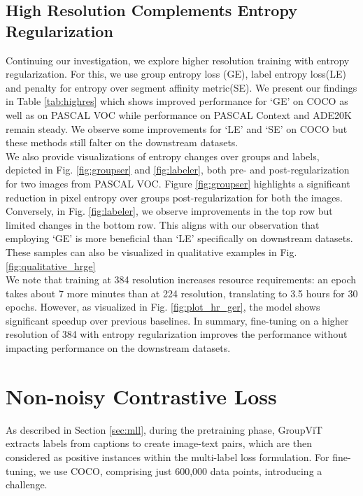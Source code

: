 \subsection{High Resolution Complements Entropy Regularization}
\label{sec:hrcer}
Continuing our investigation, we explore higher resolution training with entropy regularization. For this, we use group entropy loss (GE), label entropy loss(LE) and penalty for entropy over segment affinity metric(SE). We present our findings in Table \ref{tab:highres} which shows improved performance for `GE' on COCO as well as on PASCAL VOC while performance on PASCAL Context and ADE20K remain steady. We observe some improvements for `LE' and `SE' on COCO but these methods still falter on the downstream datasets. \\
We also provide visualizations of entropy changes over groups and labels, depicted in Fig. \ref{fig:groupser} and \ref{fig:labeler}, both pre- and post-regularization for two images from PASCAL VOC. Figure \ref{fig:groupser} highlights a significant reduction in pixel entropy over groups post-regularization for both the images. Conversely, in Fig. \ref{fig:labeler}, we observe improvements in the top row but limited changes in the bottom row. This aligns with our observation that employing `GE' is more beneficial than `LE' specifically on downstream datasets. These samples can also be visualized in qualitative examples in Fig. \ref{fig:qualitative_hrge} \\
We note that training at 384 resolution increases resource requirements: an epoch takes about 7 more minutes than at 224 resolution, translating to 3.5 hours for 30 epochs. However, as visualized in Fig. \ref{fig:plot_hr_ger}, the model shows significant speedup over previous baselines.
In summary, fine-tuning on a higher resolution of 384 with entropy regularization improves the performance without impacting performance on the downstream datasets.


\section{Non-noisy Contrastive Loss}
\label{sec:nncl}
As described in Section \ref{sec:mll}, during the pretraining phase, GroupViT extracts labels from captions to create image-text pairs, which are then considered as positive instances within the multi-label loss formulation.  For fine-tuning, we use COCO, comprising just 600,000 data points, introducing a challenge.

